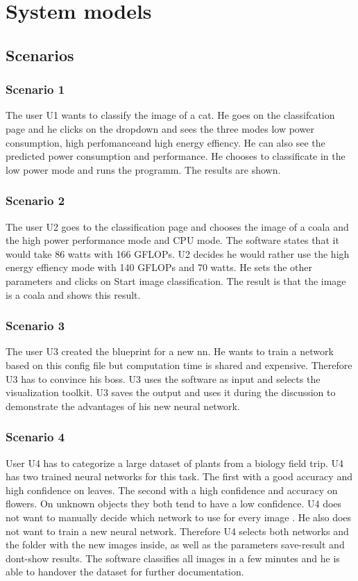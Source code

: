 \documentclass[parskip=full]{scrartcl}
\begin{document}
\section{System models}
\subsection{Scenarios}
\subsubsection{Scenario 1}
The user U1 wants to classify the image of a cat. He goes on the classifcation page and he clicks on the dropdown and sees the three modes \glqq low power consumption\grqq , \glqq high perfomance\grqq and \glqq high energy effiency\grqq . He can also see the predicted \gls{power consumption} and \gls{performance}. He chooses to classificate in the low power mode and runs the programm. The results are shown.
\subsubsection{Scenario 2}
The user U2 goes to the classification page and chooses the image of a coala and the high power \gls{performance} mode and CPU mode. The software states that it would take 86 watts with 166 GFLOPs. U2 decides he would rather use the high energy effiency mode with 140 GFLOPs and 70 watts. He sets the other parameters and clicks on Start \gls{image classification}. The result is that the image is a coala and shows this result. 
\subsubsection{Scenario 3}
The user U3 created the blueprint for a new nn.
He wants to train a network based on this config file but computation time is shared and expensive. Therefore U3 has to convince his boss.
U3 uses the software as input and selects the visualization toolkit.
U3 saves the output and uses it during the discussion to demonstrate the advantages of his new neural network.
\clearpage
\subsubsection{Scenario 4}
User U4 has to categorize a large dataset of plants from a biology field trip. U4 has two trained neural networks for this task. The first with a good accuracy and high confidence on leaves. The second with a high confidence and accuracy on flowers. On unknown objects they both tend to have a low confidence. U4 does not want to manually decide which network to use for every image . He also does not want to train a new neural network. Therefore U4 selects both networks and the folder with the new images inside, as well as the parameters save-result and dont-show results. The software classifies all images in a few minutes and he is able to handover the dataset for further documentation.
\end{document}
